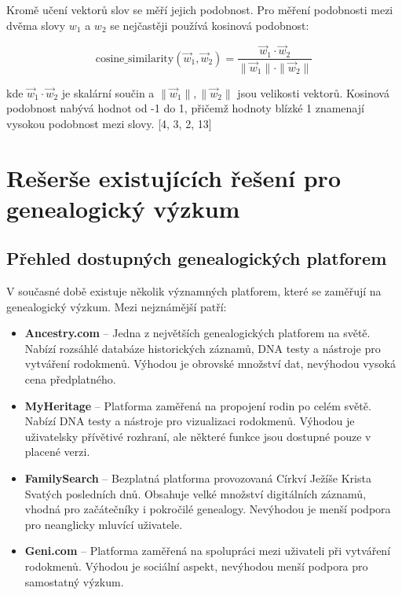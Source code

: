 \documentclass[czech, ba, kiv, he]{fasthesis}
\begin{document}
Kromě učení vektorů slov se měří jejich podobnost. Pro měření podobnosti mezi dvěma slovy \( w_1 \) a \( w_2 \) se nejčastěji používá kosinová podobnost:  

\begin{equation}  
\mathrm{cosine\_similarity}(\vec{w}_1, \vec{w}_2) = \frac{\vec{w}_1 \cdot \vec{w}_2}{\|\vec{w}_1\| \cdot \|\vec{w}_2\|}  
\end{equation}  

kde \( \vec{w}_1 \cdot \vec{w}_2 \) je skalární součin a \( \|\vec{w}_1\|, \|\vec{w}_2\| \) jsou velikosti vektorů. Kosinová podobnost nabývá hodnot od -1 do 1, přičemž hodnoty blízké 1 znamenají vysokou podobnost mezi slovy. [4, 3, 2, 13]




\section{Rešerše existujících řešení pro genealogický výzkum}

\subsection{Přehled dostupných genealogických platforem}
V současné době existuje několik významných platforem, které se zaměřují na genealogický výzkum. Mezi nejznámější patří:

\begin{itemize}
    \item \textbf{Ancestry.com} -- Jedna z největších genealogických platforem na světě. Nabízí rozsáhlé databáze historických záznamů, DNA testy a nástroje pro vytváření rodokmenů. Výhodou je obrovské množství dat, nevýhodou vysoká cena předplatného.
    \item \textbf{MyHeritage} -- Platforma zaměřená na propojení rodin po celém světě. Nabízí DNA testy a nástroje pro vizualizaci rodokmenů. Výhodou je uživatelsky přívětivé rozhraní, ale některé funkce jsou dostupné pouze v placené verzi.
    \item \textbf{FamilySearch} -- Bezplatná platforma provozovaná Církví Ježíše Krista Svatých posledních dnů. Obsahuje velké množství digitálních záznamů, vhodná pro začátečníky i pokročilé genealogy. Nevýhodou je menší podpora pro neanglicky mluvící uživatele.
    \item \textbf{Geni.com} -- Platforma zaměřená na spolupráci mezi uživateli při vytváření rodokmenů. Výhodou je sociální aspekt, nevýhodou menší podpora pro samostatný výzkum.
\end{itemize}
\end{document}
